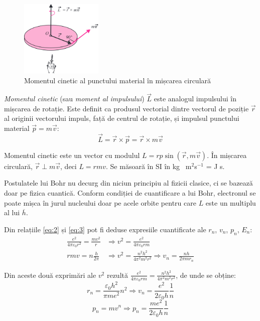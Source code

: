 \begin{figure}
    \centering
    \includegraphics[width=0.35\textwidth]{fig/moment_cinetic}
    \caption{Momentul cinetic al punctului material în mișcarea circulară}
\end{figure}

\emph{Momentul cinetic} (sau \emph{moment al impulsului}) $\vec{L}$ este
analogul impulsului în mișcarea de rotație. Este definit ca produsul vectorial
dintre vectorul de poziție $\vec{r}$ al originii vectorului impuls, față de
centrul de rotație, și impulsul punctului material $\vec{p} = m\vec{v}$:
\[ \vec{L} = \vec{r} \times \vec{p} = \vec{r} \times m\vec{v} \]

Momentul cinetic este un vector cu modulul \( L = rp\sin(\vec{r}, m\vec{v}) \).
În mișcarea circulară, \( \vec{r} \perp m\vec{v} \), deci $L = rmv$. Se măsoară
în SI în kg \cdot\ m$^2$s$^{-1}$ = J \cdot s.

\clearpage

Postulatele lui Bohr nu decurg din niciun principiu al fizicii clasice, ci se
bazează doar pe fizica cuantică. Conform condiției de cuantificare a lui Bohr,
electronul se poate mișca în jurul nucleului doar pe acele orbite pentru care
$L$ este un multiplu al lui $\overline{h}$.

Din relațiile \eqref{eq:2} și \eqref{eq:3} pot fi deduse expresiile cuantificate ale $r_n$,
$v_n$, $p_n$, $E_n$:
\begin{align*}
    \frac{e^2}{4\pi\varepsilon_0 r^2} = \frac{mv^2}{r}
    &\Rightarrow v^2 = \frac{e^2}{4\pi\varepsilon_0 rm}
    \\
    rmv = n\frac{h}{2\pi} &\Rightarrow v^2 = \frac{n^2 h^2}{4\pi^2 m^2 r^2}
    \Rightarrow \boxed{v_n = \frac{nh}{2\pi mr_n}}
\end{align*}

Din aceste două exprimări ale $v^2$ rezultă
\( \frac{e^2}{4\pi\varepsilon_0 rm} = \frac{n^2 h^2}{4\pi^2 m^2 r^2} \), de
unde se obține:
\[
    \boxed{r_n = \frac{\varepsilon_0 h^2}{\pi me^2} n^2}
    \Rightarrow \boxed{v_n = \frac{e^2}{2\varepsilon_0 h} \frac{1}{n}}
\]
\[
    p_n = mv^n \Rightarrow
    \boxed{p_n = \frac{me^2}{2\varepsilon_0h} \frac{1}{n}}
\]

